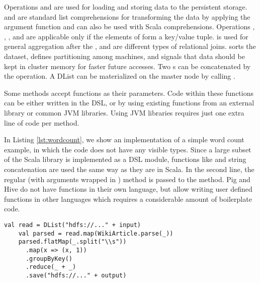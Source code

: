 Operations  and  are used for loading and storing data to the persistent storage.  and  are standard list comprehensions for transforming the data by applying the argument function and can also be used with Scala  comprehensions. Operations , , ,  and  are applicable only if the elements of  form a key/value tuple.  is used for general aggregation after the ,  and  are different types of relational joins.  sorts the dataset,  defines partitioning among machines, and  signals that data should be kept in cluster memory for faster future accesses. Two s can be concatenated by the \code{++} operation. A DList can be materialized on the master node by calling .

Some methods accept functions as their parameters. Code within these functions can be either written in the \tool DSL, or by using existing functions from an external library or common JVM libraries. Using JVM libraries requires just one extra line of code per method.  

In Listing \ref{lst:wordcount}, we show an implementation of a simple word
count example, in which the code does not have any visible  types. Since a large subset of the Scala library is implemented as a DSL module, functions like  and string concatenation are used the same way as they are in Scala. In the second line, the regular (with arguments wrapped in ) method  is passed to the  method. Pig and Hive do not have functions in their own language, but allow writing user defined functions in other languages which requires a considerable amount of boilerplate code.

\begin{lstlisting}[name=code, caption=Example of word count program where type inference removes the need to declare any \scode{Rep} types., captionpos=b, label=lst:wordcount, float=t]
    val read = DList("hdfs://..." + input)
    val parsed = read.map(WikiArticle.parse(_))
    parsed.flatMap(_.split("\\s"))
      .map(x => (x, 1))
      .groupByKey()
      .reduce(_ + _)
      .save("hdfs://..." + output)
\end{lstlisting}

